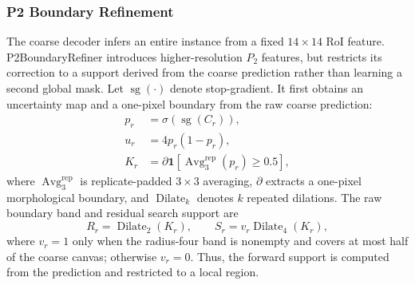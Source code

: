\documentclass[letterpaper,journal]{IEEEtran}
\begin{document}
\subsubsection{P2 Boundary Refinement}
The coarse decoder infers an entire instance from a fixed $14\times14$ RoI feature.
P2BoundaryRefiner introduces higher-resolution $P_2$ features, but restricts its correction to
a support derived from the coarse prediction rather than learning a second global mask. Let
$\operatorname{sg}(\cdot)$ denote stop-gradient. It first obtains an uncertainty map and a
one-pixel boundary from the raw coarse prediction:
\begin{equation}
\begin{aligned}
p_r&=\sigma(\operatorname{sg}(C_r)),\\
u_r&=4p_r(1-p_r),\\
K_r&=\partial\mathbf{1}[\operatorname{Avg}^{\mathrm{rep}}_3(p_r)\geq0.5],
\end{aligned}
\label{eq:p2_support}
\end{equation}
where $\operatorname{Avg}^{\mathrm{rep}}_3$ is replicate-padded $3\times3$ averaging,
$\partial$ extracts a one-pixel morphological boundary, and $\operatorname{Dilate}_k$ denotes
$k$ repeated dilations. The raw boundary band and residual search support are
\begin{equation}
R_r=\operatorname{Dilate}_2(K_r),\qquad
S_r=v_r\operatorname{Dilate}_4(K_r),
\label{eq:p2_bands}
\end{equation}
where $v_r=1$ only when the radius-four band is nonempty and covers at most half of the coarse
canvas; otherwise $v_r=0$. Thus, the forward support is computed from the prediction and
restricted to a local region.
\end{document}
